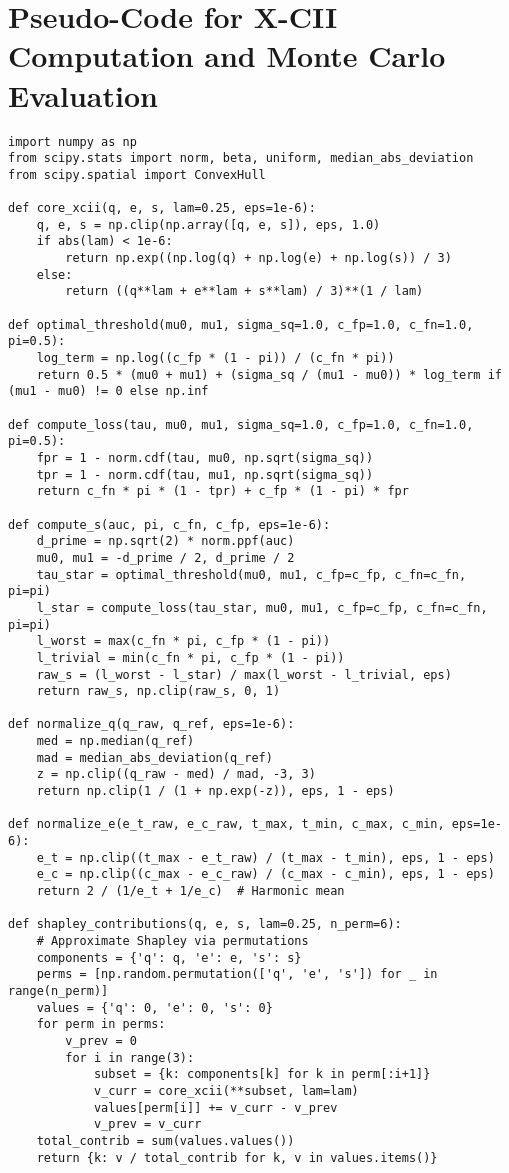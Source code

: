\documentclass[a4paper]{article}
\begin{document}
\appendix

\section{Pseudo-Code for X-CII Computation and Monte Carlo Evaluation}

\begin{verbatim}
import numpy as np
from scipy.stats import norm, beta, uniform, median_abs_deviation
from scipy.spatial import ConvexHull

def core_xcii(q, e, s, lam=0.25, eps=1e-6):
    q, e, s = np.clip(np.array([q, e, s]), eps, 1.0)
    if abs(lam) < 1e-6:
        return np.exp((np.log(q) + np.log(e) + np.log(s)) / 3)
    else:
        return ((q**lam + e**lam + s**lam) / 3)**(1 / lam)

def optimal_threshold(mu0, mu1, sigma_sq=1.0, c_fp=1.0, c_fn=1.0, pi=0.5):
    log_term = np.log((c_fp * (1 - pi)) / (c_fn * pi))
    return 0.5 * (mu0 + mu1) + (sigma_sq / (mu1 - mu0)) * log_term if (mu1 - mu0) != 0 else np.inf

def compute_loss(tau, mu0, mu1, sigma_sq=1.0, c_fp=1.0, c_fn=1.0, pi=0.5):
    fpr = 1 - norm.cdf(tau, mu0, np.sqrt(sigma_sq))
    tpr = 1 - norm.cdf(tau, mu1, np.sqrt(sigma_sq))
    return c_fn * pi * (1 - tpr) + c_fp * (1 - pi) * fpr

def compute_s(auc, pi, c_fn, c_fp, eps=1e-6):
    d_prime = np.sqrt(2) * norm.ppf(auc)
    mu0, mu1 = -d_prime / 2, d_prime / 2
    tau_star = optimal_threshold(mu0, mu1, c_fp=c_fp, c_fn=c_fn, pi=pi)
    l_star = compute_loss(tau_star, mu0, mu1, c_fp=c_fp, c_fn=c_fn, pi=pi)
    l_worst = max(c_fn * pi, c_fp * (1 - pi))
    l_trivial = min(c_fn * pi, c_fp * (1 - pi))
    raw_s = (l_worst - l_star) / max(l_worst - l_trivial, eps)
    return raw_s, np.clip(raw_s, 0, 1)

def normalize_q(q_raw, q_ref, eps=1e-6):
    med = np.median(q_ref)
    mad = median_abs_deviation(q_ref)
    z = np.clip((q_raw - med) / mad, -3, 3)
    return np.clip(1 / (1 + np.exp(-z)), eps, 1 - eps)

def normalize_e(e_t_raw, e_c_raw, t_max, t_min, c_max, c_min, eps=1e-6):
    e_t = np.clip((t_max - e_t_raw) / (t_max - t_min), eps, 1 - eps)
    e_c = np.clip((c_max - e_c_raw) / (c_max - c_min), eps, 1 - eps)
    return 2 / (1/e_t + 1/e_c)  # Harmonic mean

def shapley_contributions(q, e, s, lam=0.25, n_perm=6):
    # Approximate Shapley via permutations
    components = {'q': q, 'e': e, 's': s}
    perms = [np.random.permutation(['q', 'e', 's']) for _ in range(n_perm)]
    values = {'q': 0, 'e': 0, 's': 0}
    for perm in perms:
        v_prev = 0
        for i in range(3):
            subset = {k: components[k] for k in perm[:i+1]}
            v_curr = core_xcii(**subset, lam=lam)
            values[perm[i]] += v_curr - v_prev
            v_prev = v_curr
    total_contrib = sum(values.values())
    return {k: v / total_contrib for k, v in values.items()}


\end{verbatim}
\end{document}
